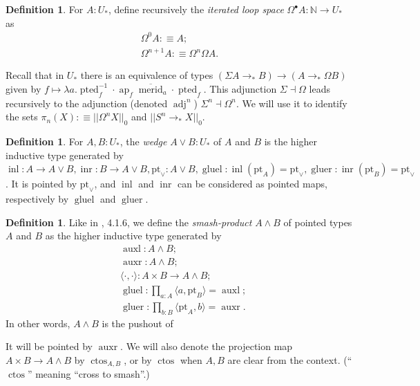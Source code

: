 \documentclass{amsart}
\theoremstyle{definition}
\newtheorem{de}[theorem]{Definition}
\newcommand{\NN}{\mathbb{N}}
\newcommand{\ap}{\operatorname{ap}}
\newcommand{\inl}{\operatorname{inl}}
\newcommand{\inr}{\operatorname{inr}}
\newcommand{\gluel}{\operatorname{gluel}}
\newcommand{\gluer}{\operatorname{gluer}}
\newcommand{\auxl}{\operatorname{auxl}}
\newcommand{\auxr}{\operatorname{auxr}}
\newcommand{\mmerid}{\overline{{\operatorname{merid}}}}
\newcommand{\depfun}[2]{\prod\limits_{#1}^{}{#2}}
\newcommand{\bs}[1]{\mathrm{pt}_{#1}}
\newcommand{\ptd}[1]{\operatorname{pted}_{#1}}
\newcommand{\pto}{\to_*}
\newcommand{\adj}[1]{\operatorname{adj}^{#1}}
\newcommand{\s}{\mathbf{2}}
\newcommand{\ctos}{\operatorname{ctos}}
\begin{document}
\begin{de}
    For $A : U_*$, define recursively the \textit{iterated loop space} $\Omega^{\bullet} A : \NN \to U_*$ as
    \begin{align*}
        \Omega^0 A : \equiv A; \\
        \Omega^{n+1} A : \equiv \Omega^n \Omega A.
    \end{align*}
\end{de}

Recall that in $U_*$ there is an equivalence of types $(\Sigma A \pto B) \to (A \pto \Omega B)$ given by $f \mapsto \lambda a.\ptd{f}^{-1}\cdot \ap_f\mmerid_{a}\cdot \ptd{f}$.
This adjunction $\Sigma \dashv \Omega$ leads recursively to the adjunction (denoted $\adj{n}$) $\Sigma^n \dashv \Omega^n$.
We will use it to identify the sets $\pi_n(X) : \equiv ||\Omega^n X||_0$ and $||S^n \pto X||_0$.

\begin{de}
    For $A, B: U_*$, the \textit{wedge} $A \vee B : U_*$ of $A$ and $B$ is the higher inductive type generated by $\inl: A \to A \vee B, \inr: B \to A \vee B, \bs{\vee}: A \vee B, \gluel: \inl(\bs{A}) = \bs{\vee}, \gluer: \inr(\bs{B}) = \bs{\vee}$. It is pointed by $\bs{\vee}$, and $\inl$ and $\inr$ can be considered as pointed maps, respectively by $\gluel$ and $\gluer$.
\end{de}

\begin{de}
    Like in \cite{Flo}, 4.1.6, we define the \textit{smash-product} $A \wedge B$ of pointed types $A$ and $B$ as the higher inductive type generated by
    \begin{align*}
    & \auxl : A \wedge B; \\
    & \auxr : A \wedge B; \\
    & \langle \cdot, \cdot \rangle: A \times B \to A \wedge B; \\
    & \gluel: \depfun{a: A}\langle a, \bs{B}\rangle = \auxl; \\
    & \gluer: \depfun{b: B}\langle \bs{A},b \rangle = \auxr.
    \end{align*}
    In other words, $A \wedge B$ is the pushout of
\end{de}
It will be pointed by $\auxr$.
We will also denote the projection map $A \times B \to A \wedge B$ by $\ctos_{A,B}$, or by $\ctos$ when $A, B$ are clear from the context. (``$\ctos$'' meaning ``cross to smash''.)
\end{document}
